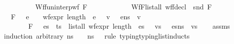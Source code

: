 \begin{isabellebody}
\ \ \ \ \ \ \ \ \ \ Wf{\isacharunderscore}{\kern0pt}{\isasymGamma}{\isacharcolon}{\kern0pt}{\isachardoublequoteopen}fun{\isacharunderscore}{\kern0pt}interp{\isacharunderscore}{\kern0pt}wf\ F\ {\isasymGamma}{\isachardoublequoteclose}\ \isanewline
\ \ \ \ \ \ \ \ \ \ Wf{\isacharunderscore}{\kern0pt}F{\isacharcolon}{\kern0pt}{\isachardoublequoteopen}list{\isacharunderscore}{\kern0pt}all\ {\isacharparenleft}{\kern0pt}wf{\isacharunderscore}{\kern0pt}fdecl\ {\isasymcirc}\ snd{\isacharparenright}{\kern0pt}\ F{\isachardoublequoteclose}\isanewline
\ \ \ {\isachardoublequoteopen}F{\isacharcomma}{\kern0pt}\ {\isasymDelta}\ {\isasymturnstile}\ e\ {\isacharcolon}{\kern0pt}\ {\isasymtau}\ {\isasymLongrightarrow}\ wf{\isacharunderscore}{\kern0pt}expr\ {\isacharparenleft}{\kern0pt}length\ {\isasymOmega}{\isacharparenright}{\kern0pt}\ e\ {\isasymLongrightarrow}\ \ {\isasymexists}v{\isachardot}{\kern0pt}\ {\isasymLambda}{\isacharcomma}{\kern0pt}{\isasymGamma}{\isacharcomma}{\kern0pt}{\isasymOmega}\ {\isasymturnstile}\ {\isasymlangle}e{\isacharcomma}{\kern0pt}n{\isacharunderscore}{\kern0pt}s{\isasymrangle}\ {\isasymDown}\ v{\isachardoublequoteclose}\ \isanewline
\ \ \ \ \ \ \ \ {\isachardoublequoteopen}F{\isacharcomma}{\kern0pt}\ {\isasymDelta}\ {\isasymturnstile}\ es\ {\isacharbrackleft}{\kern0pt}{\isacharcolon}{\kern0pt}{\isacharbrackright}{\kern0pt}\ ts\ {\isasymLongrightarrow}\ list{\isacharunderscore}{\kern0pt}all\ {\isacharparenleft}{\kern0pt}wf{\isacharunderscore}{\kern0pt}expr\ {\isacharparenleft}{\kern0pt}length\ {\isasymOmega}{\isacharparenright}{\kern0pt}{\isacharparenright}{\kern0pt}\ es\ {\isasymLongrightarrow}\ \ {\isasymexists}vs{\isachardot}{\kern0pt}\ {\isasymLambda}{\isacharcomma}{\kern0pt}{\isasymGamma}{\isacharcomma}{\kern0pt}{\isasymOmega}\ {\isasymturnstile}\ {\isasymlangle}es{\isacharcomma}{\kern0pt}n{\isacharunderscore}{\kern0pt}s{\isasymrangle}\ {\isacharbrackleft}{\kern0pt}{\isasymDown}{\isacharbrackright}{\kern0pt}\ vs{\isachardoublequoteclose}\isanewline
%
\isadelimproof
\ \ %
\endisadelimproof
%
\isatagproof
{}\isamarkupfalse%
\ assms\isanewline
{}\isamarkupfalse%
\ {\isacharparenleft}{\kern0pt}induction\ arbitrary{\isacharcolon}{\kern0pt}\ n{\isacharunderscore}{\kern0pt}s\ {\isasymLambda}\ {\isasymOmega}\ \ n{\isacharunderscore}{\kern0pt}s\ {\isasymLambda}\ {\isasymOmega}\ rule{\isacharcolon}{\kern0pt}\ typing{\isacharunderscore}{\kern0pt}typing{\isacharunderscore}{\kern0pt}list{\isachardot}{\kern0pt}inducts{\isacharparenright}{\kern0pt}\isanewline

\end{isabellebody}
